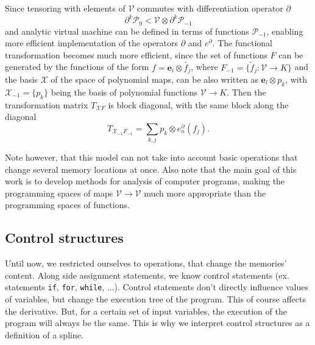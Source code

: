 \documentclass{article}
\newcommand{\VV}{\mathcal{V}}
\newcommand{\e}{\mathbf{e}}
\newcommand{\X}{\mathcal{X}}
\newcommand{\dP}{\mathcal{P}}
\newcommand{\D}{\partial}
\begin{document}
Since tensoring with elements of $\VV$ commutes with differentiation operator $\D$
\begin{equation}
  \label{eq:dP0_dP-1}
  \D^k\dP_0 < \VV\otimes \D^k\dP_{-1}
\end{equation}
and analytic virtual machine can be defined in terms of functions $\dP_{-1}$,
enabling more efficient implementation of the operators $\D$ and $e^\D$. The
functional transformation becomes much more efficient, since the set of
functions $F$ can be generated by the functions of the form  $f=\e_i\otimes
\tilde{f_j}$, where $F_{-1}=\{\tilde{f}_j:\VV\to K \}$ and the basis $\X$ of the space of polynomial
maps, can be also written as $\e_l\otimes p_k$, with $\X_{-1}=\{p_k\}$ being the basis
of polynomial functions $\VV\to K$. Then  the transformation matrix $T_{\X F}$
is block diagonal, with the same block along the diagonal
\begin{equation}
  \label{eq:block}
  T_{\X_{-1}F_{-1}} = \sum\limits_{k,j} p_k\otimes e^{\D}_n(f_j).
\end{equation}

Note however, that this model can not take into account basic operations that
change several memory locations at once. Also note that the main goal of this
work is to develop methods for analysis of computer programs, making the programming
spaces of maps $\VV\to \VV$ much more appropriate than the programming spaces of
functions.
 \subsection{Control structures}\label{sec:control}
 
 Until now, we restricted ourselves to operations, that change the memories' content. Along side assignment statements, we know control statements (ex. statements \texttt{if},
  \texttt{for}, \texttt{while}, ...). Control statements don't directly influence values of variables, but change the execution tree of the program. This of course affects the derivative. But, for a certain set of input variables, the execution of the program will always be the same. This is why we interpret control structures as a definition of a spline.
  
\end{document}
